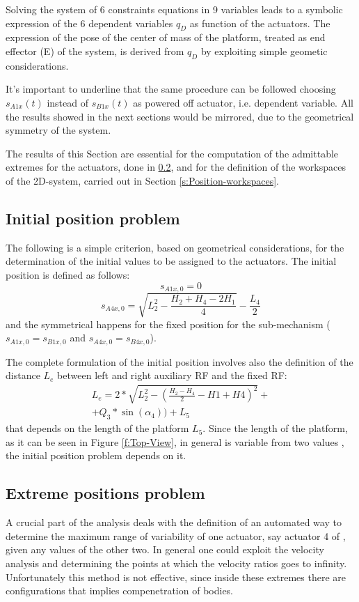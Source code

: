 \documentclass[10.5pt, twocolumn]{article}
\newcommand*\circled[1]{\tikz[baseline=(char.base)]{
	\node[shape=circle,draw,inner sep=2pt] (char) {#1};}}
\begin{document}
Solving the system of 6 constraints equations in 9 variables leads to a symbolic expression of the 6 dependent variables \( q_{D} \) as function of the actuators. The expression of the pose of the center of mass of the platform, treated as end effector (E) of the system, is derived from \( q_{D} \) by exploiting simple geometic considerations.

It's important to underline that the same procedure can be followed choosing \( s_{A1x}(t) \) instead of \( s_{B1x}(t) \) as powered off actuator, i.e. dependent variable. All the results showed in the next sections would be mirrored, due to the geometrical symmetry of the system.

The results of this Section are essential for the computation of the admittable extremes for the actuators, done in \ref{s:Extreme-positions}, and for the definition of the workspaces of the 2D-system, carried out in Section \ref{s:Position-workspaces}.

\subsection{Initial position problem}
\label{s:Initial-position}
The following is a simple criterion, based on geometrical considerations, for the determination of the initial values to be assigned to the actuators. The initial position is defined as follows:
\begin{equation}
  s_{A1x,0} = 0
\end{equation}
\begin{equation}
  s_{A4x,0} = \sqrt{L_2^2-\frac{H_2+H_4-2H_1}{4}} - \frac{L_4}{2}
\end{equation}
and the symmetrical happens for the fixed position for the sub-mechanism \circled{B} (\( s_{A1x,0} = s_{B1x,0} \) and \( s_{A4x,0} = s_{B4x,0} \)).

The complete formulation of the initial position involves also the definition of the distance \( L_e \) between left and right auxiliary RF and the fixed RF:
\begin{multline}
  L_e = 2*\sqrt{L_2^2-(\frac{H_2-H_4}{2}-H1+H4)^2}+\\
  + Q_3*\sin(\alpha_4)) + L_5
\end{multline}
that depends on the length of the platform \( L_5 \). Since the length of the platform, as it can be seen in Figure \ref{f:Top-View}, in general is variable from two values \cite{aVDS}, the initial position problem depends on it.

\subsection{Extreme positions problem}
\label{s:Extreme-positions}
A crucial part of the analysis deals with the definition of an automated way to determine the maximum range of variability of one actuator, say actuator 4 of \circled{B}, given any values of the other two. In general one could exploit the velocity analysis and determining the points at which the velocity ratios goes to infinity. Unfortunately this method is not effective, since inside these extremes there are configurations that implies compenetration of bodies.
\end{document}
